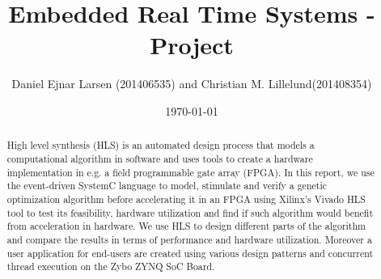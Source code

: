 \documentclass{article}
\title{Embedded Real Time Systems - Project}
\author{Daniel Ejnar Larsen (201406535) and Christian M. Lillelund(201408354)}
\date{\today}
\begin{document}
\maketitle
\begin{abstract}
High level synthesis (HLS) is an automated design process that models a computational algorithm in software and uses tools to create a hardware implementation in e.g. a field programmable gate array (FPGA). In this report, we use the event-driven SystemC language to model, stimulate and verify a genetic optimization algorithm before accelerating it in an FPGA using Xilinx's Vivado HLS tool to test its feasibility, hardware utilization and find if such algorithm would benefit from acceleration in hardware. We use HLS to design different parts of the algorithm and compare the results in terms of performance and hardware utilization. Moreover a user application for end-users are created using various design patterns and concurrent thread execution on the Zybo ZYNQ SoC Board. 
\end{abstract}






















\appendix

%
\end{document}
